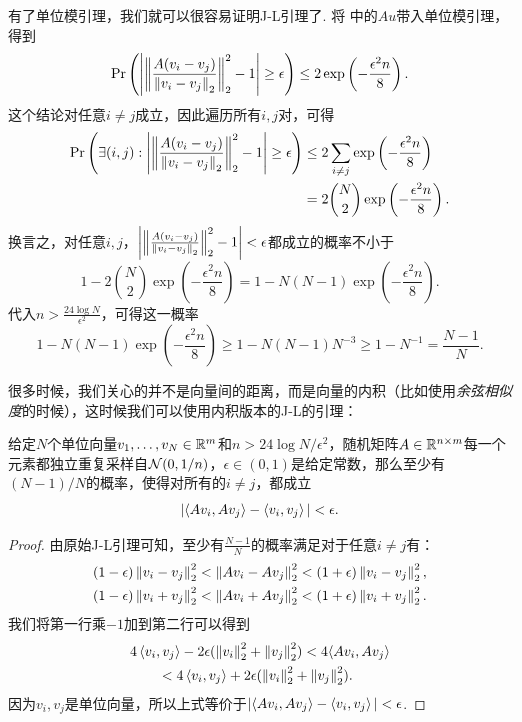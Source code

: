 有了单位模引理，我们就可以很容易证明J-L引理了. 将 中的$Au$带入单位模引理，得到
\[
    \Pr\left(\left|\left\|\frac{A(v_i-v_j)}{\left\|v_i-v_j\right\|_2}\right\|_2^2 - 1 \right| \geq \epsilon\right)\leq  2\exp \left(-\frac{\epsilon^2 n}{8}\right). 
\]
这个结论对任意$i\neq j$成立，因此遍历所有$i,j$对，可得
\[
\begin{aligned}
    \Pr\left(\exists (i,j): \left|\left\|\frac{A(v_i-v_j)}{\left\|v_i-v_j\right\|_2}\right\|_2^2 - 1 \right| \geq \epsilon\right)
    &\leq 2 \sum_{i\neq j} \exp \left(-\frac{\epsilon^2 n}{8}\right) \\
    &=  2  \binom{N}{2}\exp \left(-\frac{\epsilon^2 n}{8}\right). 
\end{aligned}
\]
换言之，对任意$i,j$，$\left|\left\|\frac{A(v_i-v_j)}{\left\|v_i-v_j\right\|_2}\right\|_2^2 - 1 \right| < \epsilon$都成立的概率不小于
\[
1 - 2  \binom{N}{2}\exp \left(-\frac{\epsilon^2 n}{8}\right) = 1 - N(N-1)\exp \left(-\frac{\epsilon^2 n}{8}\right). 
\]
代入$n > \frac{24\log N}{\epsilon^2}$，可得这一概率
\[
1 - N(N-1)\exp \left(-\frac{\epsilon^2 n}{8}\right) \geq 1 - N(N-1)N^{-3}\geq 1 - N^{-1} = \frac{N-1}{N}. 
\]

很多时候，我们关心的并不是向量间的距离，而是向量的内积（比如使用\textit{余弦相似度}的时候），这时候我们可以使用内积版本的J-L的引理：
\begin{theorem}\label{theorem:johnson-lindenstrauss-lemma-inner-product}
    给定$N$个单位向量$v_1,\dots,v_N\in\mathbb{R}^m$和$n > 24\log N/\epsilon^2$，随机矩阵$A\in \mathbb{R}^{n\times m}$每一个元素都独立重复采样自$\mathcal{N}(0,1/n)$，$\epsilon \in (0,1)$是给定常数，那么至少有$(N-1)/N$的概率，使得对所有的$i\neq j$，都成立
    \[
        |\langle Av_i, Av_j\rangle - \left\langle{v_i},{v_j}\right\rangle|< \epsilon.
    \]
\end{theorem}    
\begin{proof}
由原始J-L引理可知，至少有$\frac{N-1}{N}$的概率满足对于任意$i\neq j$有：
    \[
    \begin{aligned}
        &(1 - \epsilon)\left\|v_i-v_j\right\|_2^2 < \left\|Av_i-Av_j\right\|_2^2< (1 + \epsilon)\left\|v_i-v_j\right\|_2^2, \\
        &(1 - \epsilon)\left\|v_i+v_j\right\|_2^2 < \left\|Av_i+Av_j\right\|_2^2 < (1 + \epsilon)\left\|v_i+v_j\right\|_2^2. 
    \end{aligned}
    \]
我们将第一行乘$-1$加到第二行可以得到
\begin{align*}
    &4\left\langle{v_i},{v_j}\right\rangle - 2 \epsilon (\left\|v_i\right\|_2^2 + \left\|v_j\right\|_2^2) <4\langle Av_i, Av_j\rangle\\
    &\qquad< 4\left\langle{v_i},{v_j}\right\rangle + 2 \epsilon (\left\|v_i\right\|_2^2 + \left\|v_j\right\|_2^2).
\end{align*}
因为$v_i,v_j$是单位向量，所以上式等价于$|\langle Av_i, Av_j\rangle - \left\langle{v_i},{v_j}\right\rangle|<\epsilon$. 
\end{proof}

